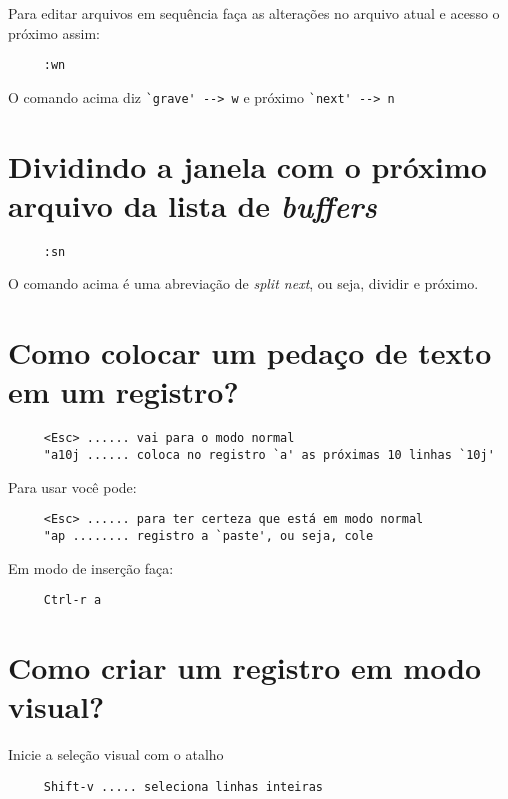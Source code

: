 Para editar arquivos em sequência faça as alterações no arquivo atual
e acesso o próximo assim:

\begin{verbatim}
     :wn
\end{verbatim}

O comando acima diz \verb|`grave' --> w|  e próximo \verb|`next' --> n|

\section{Dividindo a janela com o próximo arquivo da lista de {\em buffers}}
\label{Dividindo a janela com o próximo arquivo da lista de buffers}

\begin{verbatim}
     :sn
\end{verbatim}

O comando acima é uma abreviação de {\em split next}, ou seja, dividir e próximo.

\section{Como colocar um pedaço de texto em um registro?}
\label{Como colocar um pedaço de texto em um registro?}

\begin{verbatim}
     <Esc> ...... vai para o modo normal
     "a10j ...... coloca no registro `a' as próximas 10 linhas `10j'
\end{verbatim}

Para usar você pode:

\begin{verbatim}
     <Esc> ...... para ter certeza que está em modo normal
     "ap ........ registro a `paste', ou seja, cole
\end{verbatim}

Em modo de inserção faça:

\begin{verbatim}
     Ctrl-r a
\end{verbatim}

\section{Como criar um registro em modo visual?}
\label{Como criar um registro em modo visual?}
Inicie a seleção visual com o atalho

\begin{verbatim}
     Shift-v ..... seleciona linhas inteiras
\end{verbatim}

